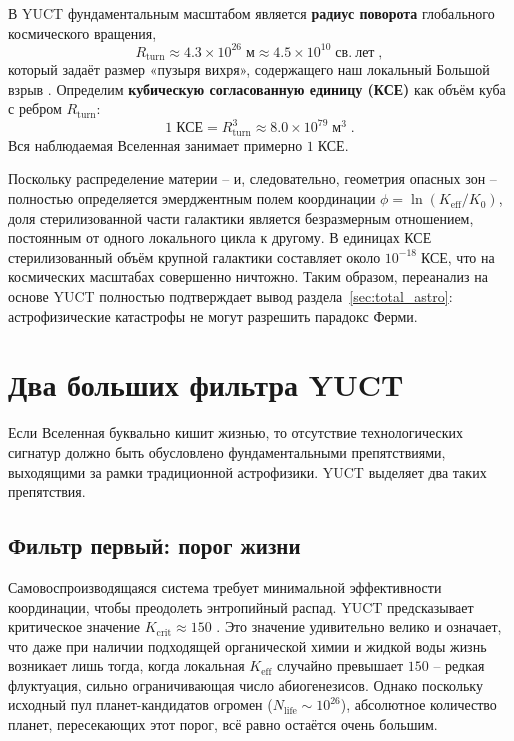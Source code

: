 \documentclass[11pt,a4paper]{article}
\newcommand{\Keff}{K_{\mathrm{eff}}}
\begin{document}
	В YUCT фундаментальным масштабом является \textbf{радиус поворота} глобального космического вращения,
	\begin{equation}
		R_{\mathrm{turn}} \approx 4.3\times 10^{26}\;\mathrm{м}
		\approx 4.5\times 10^{10}\;\mathrm{св.\ лет}\; ,
	\end{equation}
	который задаёт размер «пузыря вихря», содержащего наш локальный Большой взрыв \citep{AppOmega}. Определим \textbf{кубическую согласованную единицу (КСЕ)} как объём куба с ребром \(R_{\mathrm{turn}}\):
	\begin{equation}
		1\;\text{КСЕ} = R_{\mathrm{turn}}^{3} \approx 8.0\times 10^{79}\;\text{м}^{3}\; .
	\end{equation}
	Вся наблюдаемая Вселенная занимает примерно \(1\;\text{КСЕ}\).
	
	Поскольку распределение материи – и, следовательно, геометрия опасных зон – полностью определяется эмерджентным полем координации \(\phi = \ln(\Keff/K_{0})\), доля стерилизованной части галактики является безразмерным отношением, постоянным от одного локального цикла к другому. В единицах КСЕ стерилизованный объём крупной галактики составляет около \(10^{-18}\;\text{КСЕ}\), что на космических масштабах совершенно ничтожно. Таким образом, переанализ на основе YUCT полностью подтверждает вывод раздела~\ref{sec:total_astro}: астрофизические катастрофы не могут разрешить парадокс Ферми.
	
	\section{Два больших фильтра YUCT}
	\label{sec:yuct_filters}
	Если Вселенная буквально кишит жизнью, то отсутствие технологических сигнатур должно быть обусловлено фундаментальными препятствиями, выходящими за рамки традиционной астрофизики. YUCT выделяет два таких препятствия.
	
	\subsection{Фильтр первый: порог жизни}
	\label{sec:filter1}
	Самовоспроизводящаяся система требует минимальной эффективности координации, чтобы преодолеть энтропийный распад. YUCT предсказывает критическое значение \(K_{\mathrm{crit}}\approx 150\) \citep{AppT}. Это значение удивительно велико и означает, что даже при наличии подходящей органической химии и жидкой воды жизнь возникает лишь тогда, когда локальная \(K_{\mathrm{eff}}\) случайно превышает \(150\) – редкая флуктуация, сильно ограничивающая число абиогенезисов. Однако поскольку исходный пул планет-кандидатов огромен (\(N_{\mathrm{life}}\sim 10^{26}\)), абсолютное количество планет, пересекающих этот порог, всё равно остаётся очень большим.
	
\end{document}
